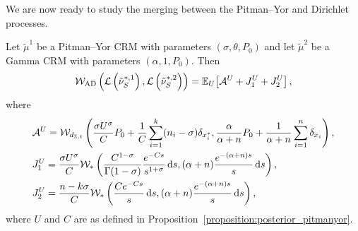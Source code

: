 We are now ready to study the merging between the Pitman--Yor and Dirichlet processes.
\begin{proposition}\label{proposition:distance_pitmanyor_gamma}
    Let $\tilde{\mu}^1$ be a Pitman--Yor CRM with parameters $(\sigma, \theta, P_0)$ and let $\tilde{\mu}^2$ be a Gamma CRM with parameters $(\alpha, 1, P_0)$. Then
    \[
    \mathcal{W}_{\mathrm{AD}}\left( \mathcal{L}\left(\tilde{\nu}^{*,1}_{S}\right),  \mathcal{L}\left(\tilde{\nu}^{*,2}_{S}\right) \right) = \mathbb{E}_U\!\left[\mathcal{A}^U + J_1^U + J_2^U \right],
    \]
    where
    \begin{align*}
        & \mathcal{A}^U = \mathcal{W}_{d_{\mathbb{X},t}}\left( \frac{\sigma U^\sigma}{C}P_0 + \frac{1}{C}\sum_{i = 1}^{k}(n_i - \sigma)\delta_{x_i^*}, \frac{\alpha}{\alpha + n}P_0 + \frac{1}{\alpha + n}\sum_{i = 1}^n \delta_{x_i}\right), \\
        & J_1^U = \frac{\sigma U^\sigma}{C}\mathcal{W}_*\left( \frac{C^{1-\sigma}}{\Gamma(1-\sigma)}\frac{e^{-Cs}}{s^{1+\sigma}}\,\mathrm{d}s, (\alpha+n)\frac{e^{-(\alpha+n)s}}{s}\,\mathrm{d}s\right), \\
        & J_2^U = \frac{n - k\sigma}{C}\mathcal{W}_*\left( \frac{Ce^{-Cs}}{s}\,\mathrm{d}s, (\alpha + n)\frac{e^{-(\alpha+n)s}}{s}\,\mathrm{d}s\right),
    \end{align*}
    where $U$ and $C$ are as defined in Proposition~\ref{proposition:posterior_pitmanyor}.
\end{proposition}
